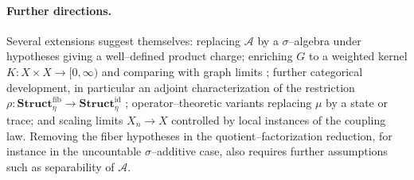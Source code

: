 \documentclass[11pt]{article}
\numberwithin{equation}{section}
\theoremstyle{definition}
\begin{document}
\paragraph{Further directions.}
Several extensions suggest themselves: replacing $\mathcal A$ by a $\sigma$--algebra under hypotheses giving a well--defined product charge; enriching $G$ to a weighted kernel $K:X\times X\to[0,\infty)$ and comparing with graph limits \cite{Lovasz}; further categorical development, in particular an adjoint characterization of the restriction $\rho:\mathbf{Struct}_\eta^{\mathrm{fib}}\to\mathbf{Struct}^{\mathrm{id}}_\eta$ \cite{MacLane,Riehl}; operator--theoretic variants replacing $\mu$ by a state or trace; and scaling limits $X_n\to X$ controlled by local instances of the coupling law. Removing the fiber hypotheses in the quotient--factorization reduction, for instance in the uncountable $\sigma$--additive case, also requires further assumptions such as separability of $\mathcal A$.

\end{document}
